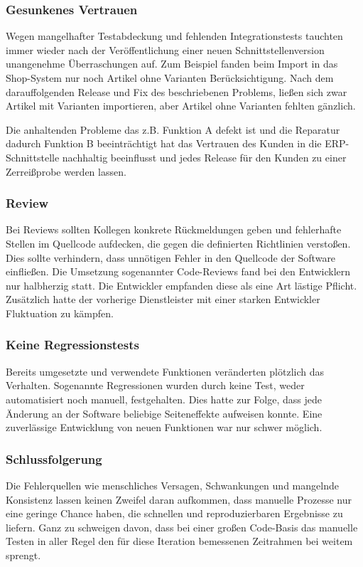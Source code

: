 \subsubsection{Gesunkenes Vertrauen}
Wegen mangelhafter Testabdeckung und fehlenden Integrationstests tauchten immer wieder nach der Veröffentlichung einer neuen Schnittstellenversion unangenehme Überraschungen auf. Zum Beispiel fanden beim Import in das Shop-System nur noch Artikel ohne Varianten Berücksichtigung. Nach dem darauffolgenden Release und Fix des beschriebenen Problems, ließen sich zwar Artikel mit Varianten importieren, aber Artikel ohne Varianten fehlten gänzlich.

Die anhaltenden Probleme das z.B. Funktion A defekt ist und die Reparatur dadurch Funktion B beeinträchtigt hat das Vertrauen des Kunden in die ERP-Schnittstelle nachhaltig beeinflusst und jedes Release für den Kunden zu einer Zerreißprobe werden lassen. 

\subsubsection{Review}
Bei Reviews sollten Kollegen konkrete Rückmeldungen geben und fehlerhafte Stellen im Quellcode aufdecken, die gegen die definierten Richtlinien verstoßen. Dies sollte verhindern, dass unnötigen Fehler in den Quellcode der Software einfließen. Die Umsetzung sogenannter Code-Reviews fand bei den Entwicklern nur halbherzig statt. Die Entwickler empfanden diese als eine Art lästige Pflicht. Zusätzlich hatte der vorherige Dienstleister mit einer starken Entwickler Fluktuation zu kämpfen. 

\subsubsection{Keine Regressionstests}
Bereits umgesetzte und verwendete Funktionen veränderten plötzlich das Verhalten. Sogenannte Regressionen wurden durch keine Test, weder automatisiert noch manuell, festgehalten. Dies hatte zur Folge, dass jede Änderung an der Software beliebige Seiteneffekte aufweisen konnte. Eine zuverlässige Entwicklung von neuen Funktionen war nur schwer möglich.

\subsubsection{Schlussfolgerung}
Die Fehlerquellen wie menschliches Versagen, Schwankungen und mangelnde Konsistenz lassen keinen Zweifel daran aufkommen, dass manuelle Prozesse nur eine geringe Chance haben, die
schnellen und reproduzierbaren Ergebnisse zu liefern. Ganz zu schweigen davon, dass bei einer großen Code-Basis das manuelle Testen in aller Regel den für diese Iteration bemessenen Zeitrahmen
bei weitem sprengt.

